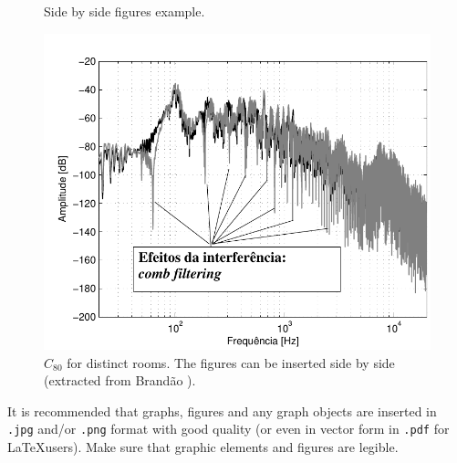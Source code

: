 \documentclass[12pt, a4paper, twoside, twocolumn]{article}
\begin{document}
\begin{figure}[H]
  \centering \vspace{-1.5mm}
	\qquad
  \caption{Side by side figures example.}
  \label{subfig.exemplo}
\end{figure}

\begin{figure}[ht!]
	\centering \vspace{-6mm}
        \includegraphics[width=0.98\linewidth,page=1]{figs/Combfilter-Brandao-2017.pdf}
        \caption{$C_{80}$ for distinct rooms. The figures can be inserted side by side (extracted from Brandão \cite{Brandao-2017}).}
	\label{fig:C80}%
\end{figure}


It is recommended that graphs, figures and any graph objects are inserted in \texttt{.jpg} and/or \texttt{.png} format with good quality (or even in vector form in \texttt{.pdf} for \LaTeX users). Make sure that graphic elements and figures are legible.
\end{document}
